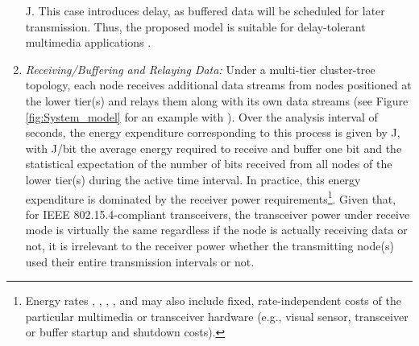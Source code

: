 \documentclass[twocolumn,english]{IEEEtran}
\theoremstyle{plain}
\theoremstyle{definition}
\begin{document}
\begin{enumerate}[leftmargin=*]
J. This case introduces delay, as buffered data will be scheduled
for later transmission. Thus, the proposed model is suitable for delay-tolerant
multimedia applications \cite{citeulike:3839709}.

\item

\emph{Receiving/Buffering and Relaying Data:} Under a multi-tier cluster-tree
topology, each node receives  additional data streams from 
nodes positioned at the lower tier(s) and relays them along with its
own data streams (see Figure \ref{fig:System_model} for an example
with ). Over the analysis interval of  seconds, the energy
expenditure corresponding to this process is given by 
J, with  J/bit the average energy required to receive and buffer
one bit and  the statistical
expectation of the number of bits received from all  nodes of
the lower tier(s) during the active time interval. In practice, this
energy expenditure is dominated by the receiver power requirements\footnote{Energy rates , , , ,  and  may also include
fixed, rate-independent costs of the particular multimedia or transceiver
hardware (e.g., visual sensor, transceiver or buffer startup and shutdown
costs).}. Given that, for IEEE 802.15.4-compliant transceivers, the transceiver
power under receive mode is virtually the same regardless if the node
is actually receiving data or not, it is irrelevant to the receiver
power whether the transmitting node(s) used their entire transmission
intervals or not.

\end{enumerate}
\end{document}
